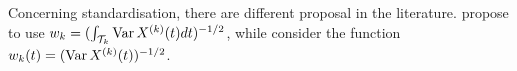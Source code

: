 Concerning standardisation, there are different proposal in the literature. \cite{happMultivariateFunctionalPrincipal2015} propose to use $w_k = (\int_{\mathcal{T}_{k}} \operatorname{Var} X^{(k)}(t)dt)^{-1/2}$, while \cite{chiouMultivariateFunctionalPrincipal2014} consider the function $w_k(t) = (\operatorname{Var} X^{(k)}(t))^{-1/2}$.


